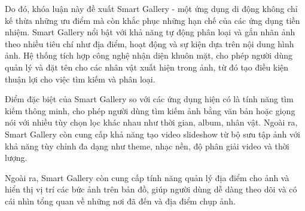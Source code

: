 Do đó, khóa luận này đề xuất Smart Gallery - một ứng dụng di động không chỉ kế thừa những ưu điểm mà còn khắc phục những hạn chế của các ứng dụng tiền nhiệm. Smart Gallery nổi bật với khả năng tự động phân loại và gắn nhãn ảnh theo nhiều tiêu chí như địa điểm, hoạt động và sự kiện dựa trên nội dung hình ảnh. Hệ thống tích hợp công nghệ nhận diện khuôn mặt, cho phép người dùng quản lý và đặt tên cho các nhân vật xuất hiện trong ảnh, từ đó tạo điều kiện thuận lợi cho việc tìm kiếm và phân loại.

Điểm đặc biệt của Smart Gallery so với các ứng dụng hiện có là tính năng tìm kiếm thông minh, cho phép người dùng tìm kiếm ảnh bằng văn bản hoặc giọng nói với nhiều tùy chọn lọc khác nhau như thời gian, album, nhân vật. Ngoài ra, Smart Gallery còn cung cấp khả năng tạo video slideshow từ bộ sưu tập ảnh với khả năng tùy chỉnh đa dạng như theme, nhạc nền, độ phân giải video và thời lượng.

Ngoài ra, Smart Gallery còn cung cấp tính năng quản lý địa điểm cho ảnh và hiển thị vị trí các bức ảnh trên bản đồ, giúp người dùng dễ dàng theo dõi và có cái nhìn tổng quan về những nơi đã đến và địa điểm chụp ảnh.